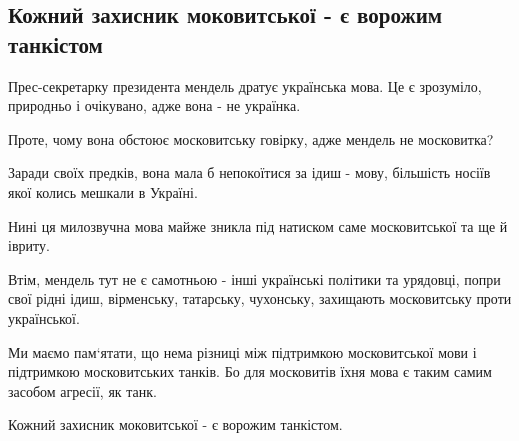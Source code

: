  
 
 
 
 

\subsection{Кожний захисник моковитської - є ворожим танкістом}
\label{sec:05_04_2021.fb.korchinskii_dmitrij.1.mova}

Прес-секретарку президента мендель дратує українська мова. Це є зрозуміло, природньо і очікувано, адже вона - не українка. 

Проте, чому вона обстоює московитську говірку, адже мендель не московитка?

Заради своїх предків, вона мала б непокоїтися за ідиш - мову, більшість носіїв якої колись мешкали в Україні. 

Нині ця милозвучна мова майже зникла під натиском саме московитської та ще й івриту. 

Втім, мендель тут не є самотньою - інші українські політики та урядовці, попри
свої рідні ідиш, вірменську, татарську, чухонську, захищають московитську проти
української. 

Ми маємо пам‘ятати, що нема різниці між підтримкою московитської мови і
підтримкою московитських танків. Бо для московитів їхня мова є таким самим
засобом агресії, як танк. 

Кожний захисник моковитської - є ворожим танкістом.
